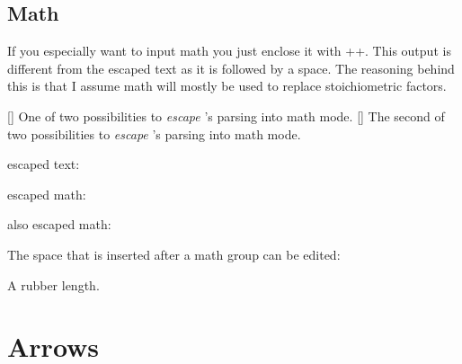 \documentclass[load-preamble+]{cnltx-doc}
\begin{document}
\subsection{Math}
If you especially want to input math you just enclose it with \verbcode+$ $+.
This output is different from the escaped text as it is followed by a space.
The reasoning behind this is that I assume math will mostly be used to replace
stoichiometric factors.
\begin{commands}
 []
   One of two possibilities to \emph{escape} \chemformula's parsing into math
   mode.
 []
   The second of two possibilities to \emph{escape} \chemformula's parsing
   into math mode.
\end{commands}
\begin{example}
  escaped text:  \par
  escaped math:  \par
  also escaped math:  \par
\end{example}

The space that is inserted after a math group can be edited:
\begin{options}
   A rubber length.
\end{options}
\begin{example}
   \par
   \par
\end{example}

\section{Arrows}\label{sec:arrows}
\end{document}
